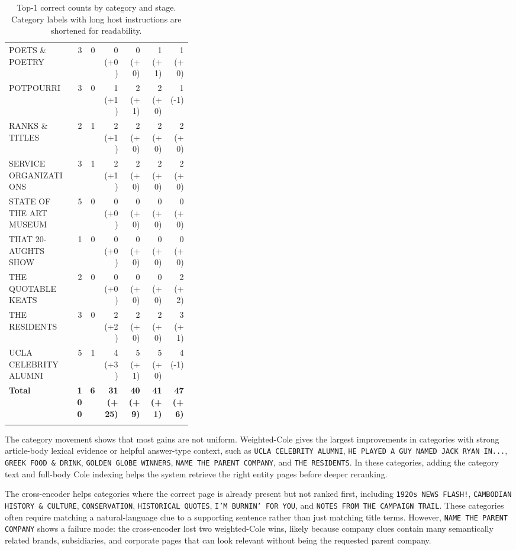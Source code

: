 \documentclass[11pt]{article}
\begin{document}
\begin{center}
\begin{longtable}{p{0.36\linewidth}rrrrrr}
POETS \& POETRY & 3 & 0 & 0 (+0) & 0 (+0) & 1 (+1) & 1 (+0) \\
POTPOURRI & 3 & 0 & 1 (+1) & 2 (+1) & 2 (+0) & 1 (-1) \\
RANKS \& TITLES & 2 & 1 & 2 (+1) & 2 (+0) & 2 (+0) & 2 (+0) \\
SERVICE ORGANIZATIONS & 3 & 1 & 2 (+1) & 2 (+0) & 2 (+0) & 2 (+0) \\
STATE OF THE ART MUSEUM & 5 & 0 & 0 (+0) & 0 (+0) & 0 (+0) & 0 (+0) \\
THAT 20-AUGHTS SHOW & 1 & 0 & 0 (+0) & 0 (+0) & 0 (+0) & 0 (+0) \\
THE QUOTABLE KEATS & 2 & 0 & 0 (+0) & 0 (+0) & 0 (+0) & 2 (+2) \\
THE RESIDENTS & 3 & 0 & 2 (+2) & 2 (+0) & 2 (+0) & 3 (+1) \\
UCLA CELEBRITY ALUMNI & 5 & 1 & 4 (+3) & 5 (+1) & 5 (+0) & 4 (-1) \\
\midrule
\textbf{Total} & \textbf{100} & \textbf{6} & \textbf{31 (+25)} & \textbf{40 (+9)} & \textbf{41 (+1)} & \textbf{47 (+6)} \\
\bottomrule
\caption{Top-1 correct counts by category and stage. Category labels with long host instructions are shortened for readability.}
\end{longtable}
\end{center}

The category movement shows that most gains are not uniform. Weighted-Cole gives the largest improvements in categories with strong article-body lexical evidence or helpful answer-type context, such as \texttt{UCLA CELEBRITY ALUMNI}, \texttt{HE PLAYED A GUY NAMED JACK RYAN IN...}, \texttt{GREEK FOOD \& DRINK}, \texttt{GOLDEN GLOBE WINNERS}, \texttt{NAME THE PARENT COMPANY}, and \texttt{THE RESIDENTS}. In these categories, adding the category text and full-body Cole indexing helps the system retrieve the right entity pages before deeper reranking.

The cross-encoder helps categories where the correct page is already present but not ranked first, including \texttt{1920s NEWS FLASH!}, \texttt{CAMBODIAN HISTORY \& CULTURE}, \texttt{CONSERVATION}, \texttt{HISTORICAL QUOTES}, \texttt{I'M BURNIN' FOR YOU}, and \texttt{NOTES FROM THE CAMPAIGN TRAIL}. These categories often require matching a natural-language clue to a supporting sentence rather than just matching title terms. However, \texttt{NAME THE PARENT COMPANY} shows a failure mode: the cross-encoder lost two weighted-Cole wins, likely because company clues contain many semantically related brands, subsidiaries, and corporate pages that can look relevant without being the requested parent company.
\end{document}
